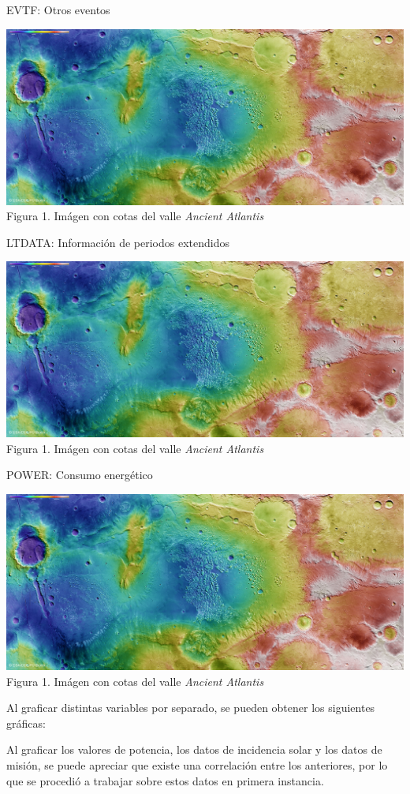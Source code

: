 \documentclass[../Main.tex]{subfiles}
\begin{document}
EVTF: Otros eventos
\begin{center}
\includegraphics[width=\linewidth, trim={0 10cm 0 0}, clip]{Assets/Ancient_Atlantis.jpg}
\\Figura 1. Imágen con cotas del valle \textit{Ancient Atlantis}
\end{center}
LTDATA: Información de periodos extendidos
\begin{center}
\includegraphics[width=\linewidth, trim={0 10cm 0 0}, clip]{Assets/Ancient_Atlantis.jpg}
\\Figura 1. Imágen con cotas del valle \textit{Ancient Atlantis}
\end{center}
POWER: Consumo energético
\begin{center}
\includegraphics[width=\linewidth, trim={0 10cm 0 0}, clip]{Assets/Ancient_Atlantis.jpg}
\\Figura 1. Imágen con cotas del valle \textit{Ancient Atlantis}
\end{center}
\newline \par
Al graficar distintas variables por separado, se pueden obtener los siguientes gráficas:
\newline \par
Al graficar los valores de potencia, los datos de incidencia solar y los datos de misión, se puede apreciar que existe una correlación entre los anteriores, por lo que se procedió a trabajar sobre estos datos en primera instancia. 
\newline \par
\end{document}
